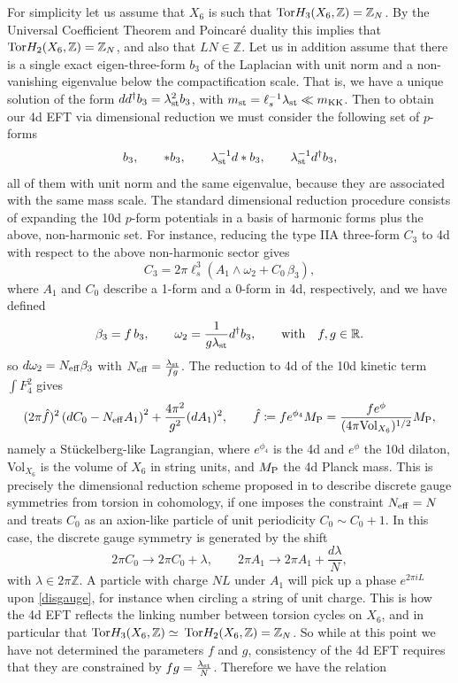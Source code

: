 \documentclass[11pt]{article}
\def\b {\beta}
\def\be{\begin{equation}}
\def\ee{\end{equation}}
\def\om{\omega}
\newcommand{\IR}{\mathbb{R}}
\newcommand{\IZ}{\mathbb{Z}}
\begin{document}
For simplicity let us assume that $X_6$ is such that ${\rm Tor}H_3(X_6,\IZ) =\IZ_N$. By the Universal Coefficient Theorem \cite{Bott1982DifferentialFI} and Poincar\'e duality this implies that ${\rm Tor}H_2(X_6,\IZ) =\IZ_N$, and also that $LN \in \IZ$. Let us in addition assume that there is a single exact eigen-three-form $b_3$ of the Laplacian with unit norm and a non-vanishing eigenvalue below the compactification scale. That is, we have a unique solution of the form $dd^{\dag} b_3 = \lambda_{\rm st}^2 b_3$, with $m_{\rm st} = \ell_s^{-1}\lambda_{\rm st} \ll m_{\rm KK}$. Then to obtain our 4d EFT via dimensional reduction we must consider the following set of $p$-forms
\be
b_3 , \qquad *b_3, \qquad  \lambda_{\rm st}^{-1} d* b_3,  \qquad \lambda_{\rm st}^{-1} d^\dag b_3 ,
\label{massivepforms}
\ee
all of them with unit norm and the same eigenvalue, because they are associated with the same mass scale. The standard dimensional reduction procedure consists of expanding the 10d $p$-form potentials in a basis of harmonic forms plus the above, non-harmonic set. For instance, reducing the type IIA three-form $C_3$ to 4d with respect to the above non-harmonic sector gives 
\be
C_3 = 2\pi  \ell_s^{3}  \left(A_1 \wedge \om_2 +  C_0 \, \b_3 \right) ,
\label{C3sing}
\ee
where $A_1$ and $C_0$ describe a 1-form and a 0-form in 4d, respectively, and we have defined
\be
\b_3 = f\, b_3 , \qquad \om_2 =  \frac{1}{g \lambda_{\rm st}} d^\dag b_3 , \qquad \text{with} \quad f, g \in \IR .
\label{alom}
\ee
so $d\om_2 = N_{\rm eff} \b_3$ with $N_{\rm eff} = \frac{\lambda_{\rm st}}{fg}$. The reduction to 4d of the 10d kinetic term $\int F_4^2$ gives
\be
(2\pi  \hat{f})^2 \left( dC_0 - N_{\rm eff} A_1 \right)^2 + \frac{4\pi^2}{g^{2}} (dA_1)^2 , \qquad \hat{f} \coloneqq  f e^{\phi_4} M_{\rm P} = \frac{f e^{\phi}}{(4\pi{\rm Vol}_{X_6})^{1/2}} M_{\rm P}  ,
\label{stuck}
\ee
namely a St\"uckelberg-like Lagrangian, where $e^{\phi_4}$ is the 4d and $e^{\phi}$ the 10d dilaton, Vol$_{X_6}$ is the volume of $X_6$ in string units, and $M_{\rm P}$ the 4d Planck mass. This is precisely the dimensional reduction scheme proposed in \cite{Camara:2011jg} to describe discrete gauge symmetries from torsion in cohomology, if one imposes the constraint $N_{\rm eff} = N$ and treats $C_0$ as an axion-like particle of unit periodicity $C_0 \sim C_0 +1$. In this case, the discrete gauge symmetry is generated by the shift
\be
2\pi C_0 \to 2\pi C_0 +\lambda , \qquad 2\pi A_1 \to  2\pi A_1 +  \frac{d\lambda}{N} ,
\label{disgauge}
\ee
with $\lambda \in 2\pi \IZ$. A particle with charge $NL$ under $A_1$ will pick up a phase $e^{2\pi i L}$ upon \eqref{disgauge}, for instance when circling a string of unit charge. This is how the 4d EFT reflects the linking number between torsion cycles on $X_6$, and in particular that ${\rm Tor} H_3(X_6,\IZ) \simeq $ ${\rm Tor} H_2(X_6,\IZ) =\IZ_N$. So while at this point we have not determined the parameters $f$ and $g$, consistency of the 4d EFT requires that they are constrained by $fg = \frac{\lambda_{\rm st}}{N}$. Therefore we have the relation
\end{document}
